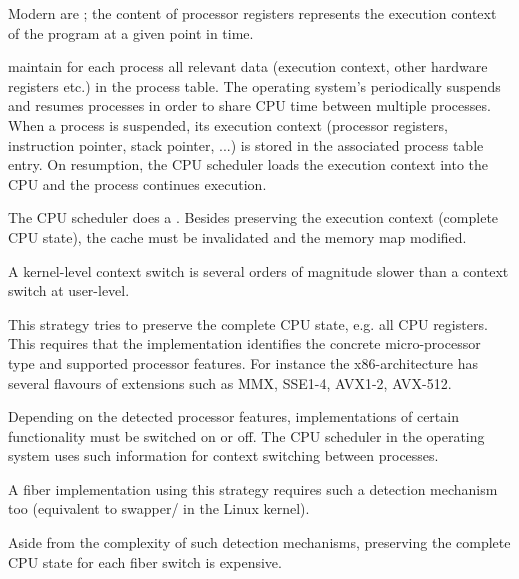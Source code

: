 \label{implementations}


Modern  are ; the content of
processor registers represents the execution context of the program at a given
point in time.

 maintain for each process all relevant data (execution
context, other hardware registers etc.) in the process table. The operating system's
 periodically suspends and resumes processes in order to
share CPU time between multiple processes. When a process is suspended, its
execution context (processor registers, instruction pointer, stack pointer, ...)
is stored in the associated process table entry. On resumption, the CPU
scheduler loads the execution context into the CPU and the process continues
execution.

The CPU scheduler does a . Besides preserving
the execution context (complete CPU state), the cache must be invalidated and
the memory map modified.

A kernel-level context switch is several orders of magnitude slower than a
context switch at user-level\cite{Tanenbaum2009}.

 This strategy tries to
preserve the complete CPU state, e.g. all CPU registers. This requires that the
implementation identifies the concrete micro-processor type and supported processor
features. For instance the x86-architecture has several flavours of extensions
such as MMX, SSE1-4, AVX1-2, AVX-512.

Depending on the detected processor features, implementations of certain
functionality must be switched on or off. The CPU scheduler in the operating system
uses such information for context switching between processes.

A fiber implementation using this strategy requires such a detection mechanism
too (equivalent to swapper/ in the Linux kernel).

Aside from the complexity of such detection mechanisms, preserving the complete
CPU state for each fiber switch is expensive.


